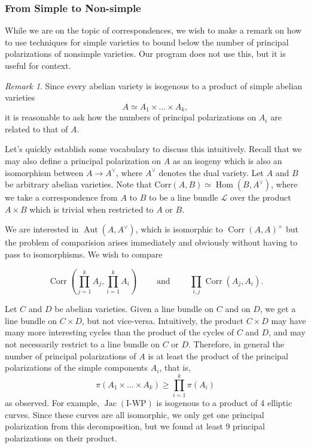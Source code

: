 \documentclass[12pt,reqno]{amsart}
\DeclareMathOperator{\Aut}{Aut}
\DeclareMathOperator{\Hom}{Hom}
\DeclareMathOperator{\Jac}{Jac}
\DeclareMathOperator{\Corr}{Corr}
\theoremstyle{definition}
\theoremstyle{remark}
\newtheorem*{remark}{Remark}
\begin{document}
\subsubsection{From Simple to Non-simple}

While we are on the topic of correspondences, we wish to make a remark on how to use techniques for simple varieties to bound below the number of principal polarizations of nonsimple varieties. Our program does not use this, but it is useful for context.

\begin{remark} Since every abelian variety is isogenous to a product of simple abelian varieties $$A \simeq A_1 \times ... \times A_k,$$ it is reasonable to ask how the numbers of principal polarizations on $A_i$ are related to that of $A$. 

Let's quickly establish some vocabulary to discuss this intuitively. Recall that we may also define a principal polarization on $A$ as an isogeny which is also an isomorphism between $A \to A^\vee$, where $A^\vee$ denotes the dual variety. Let $A$ and $B$ be arbitrary abelian varieties. Note that $\text{Corr}(A, B) \simeq \Hom(B, A^\vee)$, where we take a correspondence from $A$ to $B$ to be a line bundle $\mathcal{L}$ over the product $A \times B$ which is trivial when restricted to $A$ or $B$.

We are interested in $\Aut(A, A^\vee)$, which is isomorphic to $\Corr(A, A)^\times$ but the problem of comparision arises immediately and obviously without having to pass to isomorphisms. We wish to compare

$$\Corr\left(\prod_{j= 1}^k A_j, \prod_{i= 1}^k A_i\right) \qquad \text{ and  } \qquad \prod_{i, j} \Corr(A_j, A_i).$$

Let $C$ and $D$ be abelian varieties. Given a line bundle on $C$ and on $D$, we get a line bundle on $C \times D$, but not vice-versa. Intuitively, the product $C \times D$ may have many more interesting cycles than the product of the cycles of $C$ and $D$, and may not necessarily restrict to a line bundle on $C$ or $D$. Therefore, in general the number of principal polarizations of $A$ is at least the product of the principal polarizations of the simple components $A_i$, that is, $$\pi(A_1 \times ... \times A_k) \geq \prod_{i=1}^k \pi(A_i)$$ as observed. For example, $\Jac(\text{I-WP})$ is isogenous to a product of 4 elliptic curves. Since these curves are all isomorphic, we only get one principal polarization from this decomposition, but we found at least 9 principal polarizations on their product.
\end{remark}  
\end{document}
